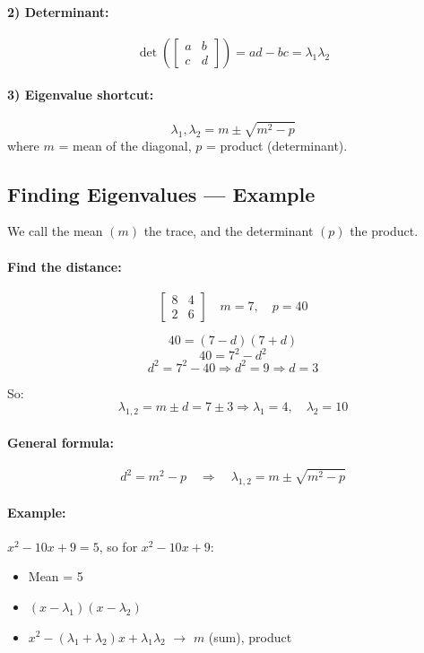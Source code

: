 \paragraph{2) Determinant:}
\[
\det\left(\begin{bmatrix} a & b \\ c & d \end{bmatrix}\right) = ad - bc = \lambda_1 \lambda_2
\]

\paragraph{3) Eigenvalue shortcut:}
\[
\lambda_1, \lambda_2 = m \pm \sqrt{m^2 - p}
\]
where $m$ = mean of the diagonal, $p$ = product (determinant).

\subsection{Finding Eigenvalues --- Example}

We call the mean $(m)$ the trace, and the determinant $(p)$ the product.

\paragraph{Find the distance:}
\[
\begin{bmatrix} 8 & 4 \\ 2 & 6 \end{bmatrix} \quad m = 7, \quad p = 40
\]

\[
40 = (7-d)(7+d)
\]
\[
40 = 7^2 - d^2
\]
\[
d^2 = 7^2 - 40 \Rightarrow d^2 = 9 \Rightarrow d = 3
\]

So:
\[
\lambda_{1,2} = m \pm d = 7 \pm 3 \Rightarrow \lambda_1 = 4, \quad \lambda_2 = 10
\]

\paragraph{General formula:}
\[
d^2 = m^2 - p \quad \Rightarrow \quad \lambda_{1,2} = m \pm \sqrt{m^2 - p}
\]

\paragraph{Example:} $x^2 - 10x + 9 = 5$, so for $x^2 - 10x + 9$:
\begin{itemize}[nosep]
  \item Mean = 5
  \item $(x - \lambda_1)(x - \lambda_2)$
  \item $x^2 - (\lambda_1 + \lambda_2)x + \lambda_1\lambda_2$ $\rightarrow$ $m$ (sum), product
\end{itemize}

